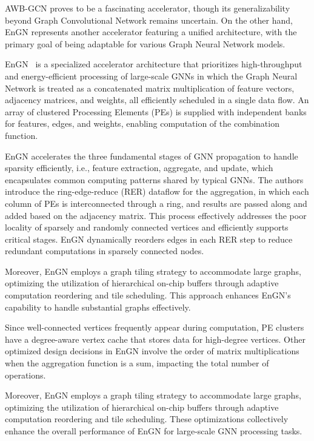 AWB-GCN proves to be a fascinating accelerator, though its generalizability beyond Graph Convolutional Network remains uncertain.
On the other hand, EnGN represents another accelerator featuring a unified architecture, with the primary goal of being adaptable for various Graph Neural Network models.

EnGN~\cite{DBLP:journals/corr/abs-1909-00155} is a specialized accelerator architecture that prioritizes high-throughput and energy-efficient processing of large-scale GNNs in which the Graph Neural Network is treated as a concatenated matrix multiplication of feature vectors, adjacency matrices, and weights, all efficiently scheduled in a single data flow.
An array of clustered Processing Elements (PEs) is supplied with independent banks for features, edges, and weights, enabling computation of the combination function.

EnGN accelerates the three fundamental stages of GNN propagation to handle sparsity efficiently, i.e., feature extraction, aggregate, and update, which encapsulates common computing patterns shared by typical GNNs.
The authors introduce the ring-edge-reduce (RER) dataflow for the aggregation, in which each column of PEs is interconnected through a ring, and results are passed along and added based on the adjacency matrix.
This process effectively addresses the poor locality of sparsely and randomly connected vertices and efficiently supports critical stages. EnGN dynamically reorders edges in each RER step to reduce redundant computations in sparsely connected nodes.

Moreover, EnGN employs a graph tiling strategy to accommodate large graphs, optimizing the utilization of hierarchical on-chip buffers through adaptive computation reordering and tile scheduling.
This approach enhances EnGN's capability to handle substantial graphs effectively.

Since well-connected vertices frequently appear during computation, PE clusters have a degree-aware vertex cache that stores data for high-degree vertices.
Other optimized design decisions in EnGN involve the order of matrix multiplications when the aggregation function is a sum, impacting the total number of operations.

Moreover, EnGN employs a graph tiling strategy to accommodate large graphs, optimizing the utilization of hierarchical on-chip buffers through adaptive computation reordering and tile scheduling.
These optimizations collectively enhance the overall performance of EnGN for large-scale GNN processing tasks.

